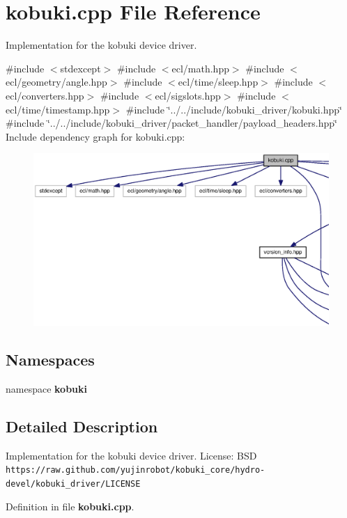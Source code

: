 \section{kobuki.\-cpp \-File \-Reference}
\label{kobuki_8cpp}


\-Implementation for the kobuki device driver.  


{\ttfamily \#include $<$stdexcept$>$}\*
{\ttfamily \#include $<$ecl/math.\-hpp$>$}\*
{\ttfamily \#include $<$ecl/geometry/angle.\-hpp$>$}\*
{\ttfamily \#include $<$ecl/time/sleep.\-hpp$>$}\*
{\ttfamily \#include $<$ecl/converters.\-hpp$>$}\*
{\ttfamily \#include $<$ecl/sigslots.\-hpp$>$}\*
{\ttfamily \#include $<$ecl/time/timestamp.\-hpp$>$}\*
{\ttfamily \#include \char`\"{}../../include/kobuki\-\_\-driver/kobuki.\-hpp\char`\"{}}\*
{\ttfamily \#include \char`\"{}../../include/kobuki\-\_\-driver/packet\-\_\-handler/payload\-\_\-headers.\-hpp\char`\"{}}\*
\-Include dependency graph for kobuki.\-cpp\-:
\nopagebreak
\begin{figure}[H]
\begin{center}
\leavevmode
\includegraphics[width=350pt]{kobuki_8cpp__incl}
\end{center}
\end{figure}
\subsection*{\-Namespaces}
\begin{DoxyCompactItemize}
\item 
namespace {\bf kobuki}
\end{DoxyCompactItemize}


\subsection{\-Detailed \-Description}
\-Implementation for the kobuki device driver. \-License\-: \-B\-S\-D {\tt https\-://raw.\-github.\-com/yujinrobot/kobuki\-\_\-core/hydro-\/devel/kobuki\-\_\-driver/\-L\-I\-C\-E\-N\-S\-E} 

\-Definition in file {\bf kobuki.\-cpp}.


